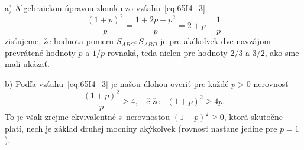 {a) Algebraickou úpravou zlomku zo vzťahu~\ref{eq:65I4_3}
$$ \frac{(1 + p)^2}{p}=\frac{1 + 2p + p^2}{p}= 2 + p + \frac{1}{p}$$
zisťujeme, že hodnota pomeru $S_{ABC} : S_{ABD}$ je pre akékoľvek dve navzájom prevrátené hodnoty $p$ a $1/p$ rovnaká, teda nielen pre hodnoty $2/3$ a $3/2$, ako sme mali ukázať.

b) Podľa vzťahu~\ref{eq:65I4_3} je našou úlohou overiť pre každé $p > 0$ nerovnosť
$$\frac{(1 + p)^2}{p}\geq4,\ \ \ \ \text{čiže} \ \ \ \  (1 + p)^2\geq 4p.$$
To je však zrejme ekvivalentné s~nerovnosťou $(1 -p)^2\geq 0$, ktorá skutočne platí, nech je základ druhej mocniny akýkoľvek (rovnosť nastane jedine pre $p = 1$).

}
